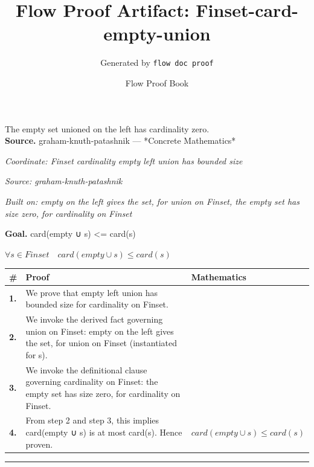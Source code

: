\documentclass[11pt]{article}
\title{Flow Proof Artifact: Finset-card-empty-union}
\author{Generated by \texttt{flow doc proof}}
\date{Flow Proof Book}
\theoremstyle{definition}
\begin{document}
\maketitle
The empty set unioned on the left has cardinality zero.\\[0.5em]
\textbf{Source.} graham-knuth-patashnik — *Concrete Mathematics*\\[0.5em]
\bigskip
{}\par
\smallskip\noindent\textit{Coordinate: Finset \cdot cardinality \cdot empty left union has bounded size}\par
\smallskip\noindent\textit{Source: graham-knuth-patashnik}\par
\smallskip\noindent\textit{Built on: empty on the left gives the set, for union on Finset, the empty set has size zero, for cardinality on Finset}\par
\medskip
\noindent\textbf{Goal.} card(empty ∪ s) <= card(s)\par
\noindent$\displaystyle \forall s \in Finset\quad card(empty ∪ s) \le card(s)$\par
\medskip
\noindent
\begin{tabular}{@{} >{\raggedright\arraybackslash}p{} >{\raggedright\arraybackslash}p{} >{\raggedleft\arraybackslash}p{} @{}}
\textbf{\#} & \textbf{Proof} & \textbf{Mathematics} \\
\midrule
\textbf{1.} & We prove that empty left union has bounded size for cardinality on Finset. & \\[0.45em]
\textbf{2.} & We invoke the derived fact governing union on Finset: empty on the left gives the set, for union on Finset (instantiated for s). & \\[0.45em]
\textbf{3.} & We invoke the definitional clause governing cardinality on Finset: the empty set has size zero, for cardinality on Finset. & \\[0.45em]
\textbf{4.} & From step 2 and step 3, this implies card(empty ∪ s) is at most card(s). Hence proven. & $\displaystyle card(empty ∪ s) \le card(s)$ \\[0.45em]
\bottomrule
\end{tabular}
\label{thm:Finset-cardinality-empty_left_union_has_bounded_size}
\par\medskip\hrule
\end{document}
